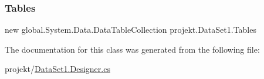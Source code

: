 \mbox{\label{classprojekt_1_1_data_set1_a1991a0961ae830e41f424a830589a720}} 
\subsubsection{\texorpdfstring{Tables}{Tables}}
{\footnotesize\ttfamily new global.\+System.\+Data.\+Data\+Table\+Collection projekt.\+Data\+Set1.\+Tables\hspace{0.3cm}{\ttfamily [get]}}



The documentation for this class was generated from the following file\+:\begin{DoxyCompactItemize}
\item 
projekt/\mbox{\hyperlink{_data_set1_8_designer_8cs}{Data\+Set1.\+Designer.\+cs}}\end{DoxyCompactItemize}
